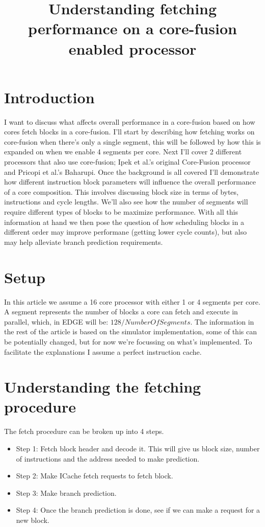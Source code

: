 

\title{Understanding fetching performance on a core-fusion enabled processor}
\section{Introduction}
I want to discuss what affects overall performance in a core-fusion based on how cores fetch blocks in a core-fusion.
I'll start by describing how fetching works on core-fusion when there's only a single segment, this will be followed by how this is expanded on when we enable 4 segments per core.
Next I'll cover 2 different processors that also use core-fusion; Ipek et al.'s original Core-Fusion processor and Pricopi et al.'s Baharupi.
Once the background is all covered I'll demonstrate how different instruction block parameters will influence the overall performance of a core composition.
This involves discussing block size in terms of bytes, instructions and cycle lengths.
We'll also see how the number of segments will require different types of blocks to be maximize performance.
With all this information at hand we then pose the question of how scheduling blocks in a different order may improve performane (getting lower cycle counts), but also may help alleviate  branch prediction requirements.

\section{Setup}
In this article we assume a 16 core processor with either 1 or 4 segments per core.
A segment represents the number of blocks a core can fetch and execute in parallel, which, in EDGE will be: $128/NumberOfSegments$.
The information in the rest of the article is based on the simulator implementation, some of this can be potentially changed, but for now we're focussing on what's implemented.
To facilitate the explanations I assume a perfect instruction cache.

\section{Understanding the fetching procedure}
The fetch procedure can be broken up into 4 steps.

\begin{itemize}
\item Step 1: Fetch block header and decode it. This will give us block size, number of instructions and the address needed to make prediction.
\item Step 2: Make ICache fetch requests to fetch block.
\item Step 3: Make branch prediction.
\item Step 4: Once the branch prediction is done, see if we can make a request for a new block.
\end{itemize}

